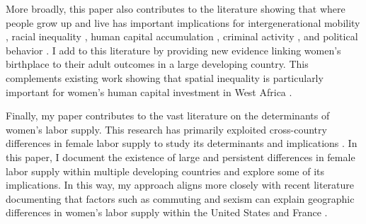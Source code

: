More broadly, this paper also contributes to the literature showing that where people grow up and live has important implications for intergenerational mobility \citep{Chetty2018,Chetty2018a}, racial inequality \citep{Chetty2020}, human capital accumulation \citep{Molina2022}, criminal activity \citep{Damm2014}, and political behavior \citep{Brown2023}. I add to this literature by providing new evidence linking women's birthplace to their adult outcomes in a large developing country. This complements existing work showing that spatial inequality is particularly important for women's human capital investment in West Africa \citep{Milsom2021}.

Finally, my paper contributes to the vast literature on the determinants of women's labor supply. This research has primarily exploited cross-country differences in female labor supply to study its determinants and implications \citep{Olivetti2008, Olivetti2014, Blau2020, Blau2015}. In this paper, I document the existence of large and persistent differences in female labor supply within multiple developing countries and explore some of its implications. In this way, my approach aligns more closely with recent literature documenting that factors such as commuting and sexism can explain geographic differences in women's labor supply within the United States and France \citep{Black2014a, Moreno-Maldonado2019, LeBarbanchon2021,Charles2018}.
